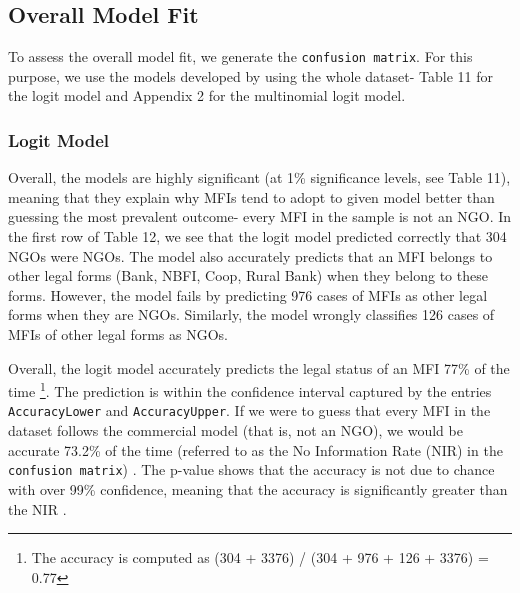 \documentclass[a4paper,nobind]{templates/ociamthesis}
\begin{document}
\newpage

\hypertarget{overall-model-fit}{%
\subsection{Overall Model Fit}\label{overall-model-fit}}

To assess the overall model fit, we generate the \texttt{confusion\ matrix}. For this purpose, we use the models developed by using the whole dataset- Table 11 for the logit model and Appendix 2 for the multinomial logit model.

\hypertarget{logit-model}{%
\subsubsection{Logit Model}\label{logit-model}}

Overall, the models are highly significant (at 1\% significance levels, see Table 11), meaning that they explain why MFIs tend to adopt to given model better than guessing the most prevalent outcome- every MFI in the sample is not an NGO. In the first row of Table 12, we see that the logit model predicted correctly that 304 NGOs were NGOs. The model also accurately predicts that an MFI belongs to other legal forms (Bank, NBFI, Coop, Rural Bank) when they belong to these forms. However, the model fails by predicting 976 cases of MFIs as other legal forms when they are NGOs. Similarly, the model wrongly classifies 126 cases of MFIs of other legal forms as NGOs.

Overall, the logit model accurately predicts the legal status of an MFI 77\% of the time \footnote{The accuracy is computed as (304 + 3376) / (304 + 976 + 126 + 3376) = 0.77}. The prediction is within the confidence interval captured by the entries \texttt{AccuracyLower} and \texttt{AccuracyUpper}. If we were to guess that every MFI in the dataset follows the commercial model (that is, not an NGO), we would be accurate 73.2\% of the time (referred to as the No Information Rate (NIR) in the \texttt{confusion\ matrix}) \autocite{cavalin2018confusion}. The p-value shows that the accuracy is not due to chance with over 99\% confidence, meaning that the accuracy is significantly greater than the NIR \autocite{kleinbaum2002logistic}.
\end{document}
